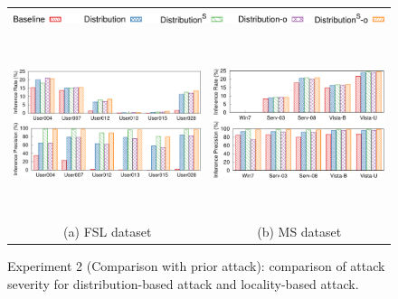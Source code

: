 \begin{figure}[t]
    \centering
    \begin{tabular}{c@{\hskip 2em}c}
        \multicolumn{2}{c}{\includegraphics[width=.7\textwidth]{pic/legend-fsl-bar.pdf}} \smallskip \\
        \includegraphics[height=2.1in]{pic/distribution-comparison-fsl.pdf} &
        \includegraphics[height=2.1in]{pic/distribution-comparison-ms.pdf} \medskip \\
        {\footnotesize 
        (a) FSL dataset 
        } &
        {\footnotesize
        (b) MS dataset 
        } \\
    \end{tabular}
    \caption{Experiment 2 (Comparison with prior attack): comparison of attack severity for distribution-based attack and locality-based attack.}
    \label{fig:distribution-comparison}
\end{figure}




